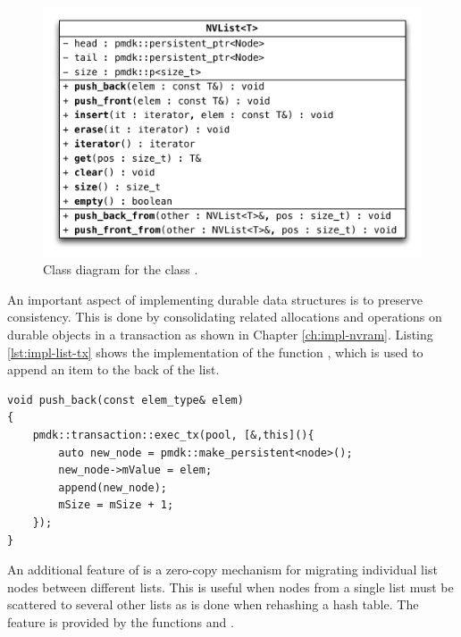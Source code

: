 \begin{figure}[!ht]
    \centering
    \includegraphics[scale=0.66]{figures/impl/list.pdf}
    \caption{Class diagram for the class .}
    \label{fig:impl-list}
\end{figure}

An important aspect of implementing durable data structures is to preserve
consistency. This is done by consolidating related allocations and operations on
durable objects in a transaction as shown in Chapter \ref{ch:impl-nvram}.
Listing \ref{lst:impl-list-tx} shows the implementation of the function
, which is used to append an item to the back of the list.

\begin{minipage}{\linewidth}
\begin{lstlisting}[caption={Implementation of \code{push\_back()} with transactional updates to NVRAM.},captionpos=b, label=lst:impl-list-tx]
void push_back(const elem_type& elem)
{
    pmdk::transaction::exec_tx(pool, [&,this](){
        auto new_node = pmdk::make_persistent<node>();
        new_node->mValue = elem;
        append(new_node);
        mSize = mSize + 1;
    });
}
\end{lstlisting}
\end{minipage}

An additional feature of  is a zero-copy mechanism for migrating
individual list nodes between different lists. This is useful when nodes from a
single list must be scattered to several other lists as is done when rehashing a
hash table. The feature is provided by the functions 
and .

